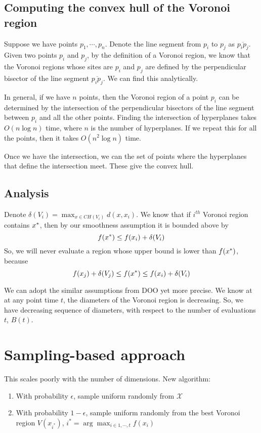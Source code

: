 \documentclass[10pt,letterpaper]{article}
\begin{document}
\subsection{Computing the convex hull of the Voronoi region}
Suppose we have points $p_1,\cdots,p_n$. 
Denote the line segment from $p_i$ to $p_j$ as $\overline{p_ip_j}$. 
Given two points  $p_i$ and $p_j$, by the definition of a Voronoi region, we know that
the Voronoi regions whose sites are $p_i$ and $p_j$ are defined by 
the perpendicular bisector of the line segment $\overline{p_ip_j}$.
We can find this analytically. 


In general, if we have $n$ points, then the Voronoi region of a point $p_i$ can be 
determined by the intersection of the perpendicular bisectors of the line segment between 
 $p_i$ and all the other points. Finding the intersection of hyperplanes 
takes $O(n\log n)$ time, where $n$ is the number of hyperplanes. 
If we repeat this for all the points, then it takes $O(n^2\log n)$ time. 

Once we have the intersection, we can the set of points where the hyperplanes that define 
the intersection meet. These give the convex hull.

\subsection{Analysis}
Denote $\delta(V_i) = \max_{x \in CH(V_i)} d(x,x_i)$.
We know that if $i^{th}$ Voronoi region contains $x^*$, then by our smoothness 
assumption it is bounded above by $$f(x^*) \leq f(x_i) + \delta(V_i)$$
So, we will never evaluate a region whose upper bound is lower than $f(x^*)$, because
$$ f(x_j) + \delta(V_j) \leq f(x^*) \leq f(x_i) + \delta(V_i) $$

We can adopt the similar assumptions from DOO yet more precise. We know at at any point time
$t$, the diameters of the Voronoi region is decreasing. So, we have decreasing sequence
of diameters, with respect to the number of evaluations $t$, $B(t)$.


\section{Sampling-based approach}
This scales poorly with the number of dimensions. New algorithm:
\begin{enumerate}
\item With probability $\epsilon$, sample uniform randomly from $\mathcal{X}$
\item With probability $1-\epsilon$, sample uniform randomly from the best Voronoi region $V(x_{i^*})$, $ i^* = \arg\max_{i \in {1,\cdots,t}} f(x_i) $
\end{enumerate}
\end{document}
